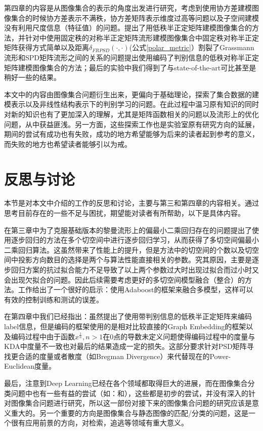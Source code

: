 第四章的内容是从图像集合的表示的角度出发进行研究，考虑到使用协方差建模图像集合的时候协方差表示不满秩，协方差矩阵表示维度过高等问题以及子空间建模没有利用尺度信息（特征值）的问题。提出了用低秩半正定矩阵建模图像集合的方法，并针对\cite{PSD_WACV}中使用固定秩的对称半正定矩阵流形建模图像集合中固定秩对称半正定矩阵获得方式简单以及距离$\delta_{FRPSD}(\cdot,\cdot)$(公式\ref{polar_metric}）割裂了Grassmann流形和SPD矩阵流形之间的关系的问题提出使用编码了判别信息的低秩对称半正定矩阵建模图像集合的方法；最后的实验中我们得到了与state-of-the-art可比甚至是稍好一些的结果。

本文中的内容由图像集合问题衍生出来，更偏向于基础理论，探索了集合数据的建模表示以及非线性结构表示下的判别学习的问题。在此过程中温习原有知识的同时对新的知识也有了更加深入的理解，尤其是矩阵函数相关的问题以及流形上的优化问题，从中获益匪浅。另一方面，这些探索工作也是实验室原有研究方向的延展，期间的尝试有成功也有失败，成功的地方希望能够为后来的读者起到参考的意义，而失败的地方也希望读者能够引以为戒。
\section{反思与讨论}
\label{sec:discuss}
本节是对本文中介绍的工作的反思和讨论，主要与第三和第四章的内容相关。通过思考目前存在的一些不足与困扰，期望能对读者有所帮助，以下是具体内容。

在第三章中为了克服基础版本的黎曼流形上的偏最小二乘回归存在的问题提出了使用逐步回归的方法在多个切空间中进行逐步回归学习，从而获得了多切空间偏最小二乘回归算法。这虽然带来了性能上的提升，但是方法中的切空间的个数以及切空间中投影方向数目的选择是两个与算法性能直接相关的参数。究其原因，主要是逐步回归方案的抗过拟合能力不足导致了以上两个参数过大时出现过拟合而过小时又会出现欠拟合的问题。因此后续需要考虑更好的多切空间模型融合（整合）的方法。工作\cite{RegionCov_pedestrain}给出了一个很好的启示：使用Adaboost的框架来融合多模型，这样可以有效的控制训练和测试的误差。

在第四章中我们已经指出：虽然提出了使用带判别信息的低秩半正定矩阵来编码label信息，但是编码的框架使用的是相对比较直接的Graph Embedding的框架以及编码过程中由于函数$x^{\frac{1}{n}},n>1$在0点的导数未定义问题使得编码过程中的度量与KDA中度量不一致也对最后的结果造成一定的损失。这部分要求针对PSD矩阵寻找更合适的度量或者散度（如Bregman Divergence）来代替现在的Power-Euclidean度量。

最后，注意到Deep Learning已经在各个领域都取得巨大的进展，而在图像集合分类问题中也有一些有益的尝试（如：\cite{Deeplearning_DRM}和\cite{Deeplearning_MMDML}），这些都是初步的尝试，并没有深入的针对图像集合问题进行研究，所以这一部份对接下来的图像集合问题的研究应该是意义重大的。另一个重要的方向是图像集合与静态图像的匹配/分类的问题，这是一个很有应用前景的方向，对检索，追逃等领域有重大意义。